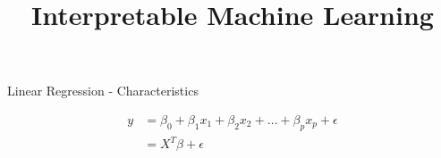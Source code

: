 \documentclass[11pt,compress,t,notes=noshow, aspectratio=169, xcolor=table]{beamer}
\title{Interpretable Machine Learning}
\date{}
\begin{document}
\newcommand{\titlefigure}{figure/whitebox}
\newcommand{\learninggoals}{
\item Examples of popular interpretable models
\item Properties of some interpretable models
\item How can we interpret them?}





\begin{frame}[c]{Linear Regression - Characteristics}

\begin{align*}
y &= \beta_0 + \beta_1 x_1 + \beta_2 x_2 + \dots + \beta_p x_p + \epsilon \\
 &= X^T\beta + \epsilon
\end{align*}


\end{frame}
\end{document}
